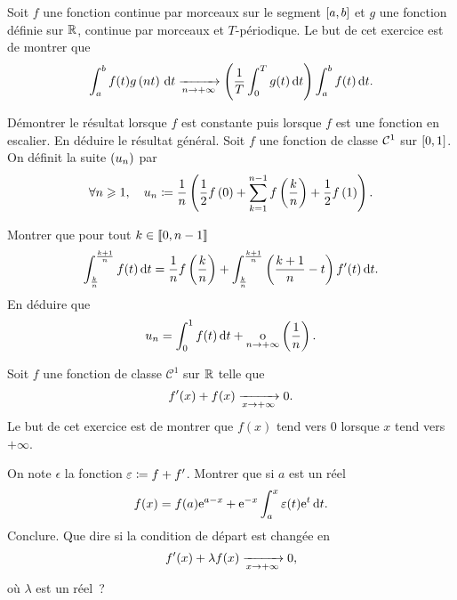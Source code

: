 \documentclass{magnolia}
\begin{document}
Soit $f$ une fonction continue par morceaux sur le segment $\left[a,b\right]$
et $g$ une fonction définie sur $\mathbb{R}$, continue par morceaux et $T$-périodique.
Le but de cet exercice est de montrer que
\[\int_{a}^{b} f(t)g\left(nt\right)\,\text{d}t \xrightarrow[n\rightarrow +\infty]{}
  \left(\frac{1}{T} \int_{0}^{T} g(t)\,\text{d}t\right) \int_{a}^{b} f(t)\,\text{d}t.\]
\begin{questions}
\question Démontrer le résultat lorsque $f$ est constante puis lorsque $f$
  est une fonction en escalier.
\question En déduire le résultat général.
\question Soit $f$ une fonction de classe $\mathcal{C}^{1}$ sur
  $\left[0,1\right]$. On définit la suite $\left(u_n\right)$ par
  \[\forall n\geqslant 1 ,\quad u_n\coloneqq \frac{1}{n}
    \left(\frac{1}{2}f\left(0\right)+\sum_{k=1}^{n-1} f\left(\frac{k}{n}\right)+\frac{1}{2}f\left(1\right)\right).\]
  \begin{questions}
  \question Montrer que pour tout $k\in\left\llbracket 0,n-1\right\rrbracket$
    \[\int_{\frac{k}{n}}^{\frac{k+1}{n}} f(t)\,\text{d}t=\frac{1}{n}f\left(\frac{k}{n}\right)
      +\int_{\frac{k}{n}}^{\frac{k+1}{n}} \left(\frac{k+1}{n}-t\right)f'(t)\,\text{d}t.\]
  \question En déduire que
    \[u_n=\int_{0}^{1} f(t)\,\text{d}t+\underset{n \rightarrow +\infty}{\text{o}}\left(\frac{1}{n}\right).\] 
  \end{questions}
\end{questions}

Soit $f$ une fonction de classe $\mathcal{C}^1$ sur $\mathbb{R}$ telle que
$$f'(x)+f(x) \xrightarrow[x\rightarrow +\infty]{} 0.$$
Le but de cet exercice est de montrer que $f(x)$ tend vers $0$ lorsque $x$
tend vers $+\infty$.
\begin{questions}
\question On note $\epsilon$ la fonction $\varepsilon\coloneqq f+f'$. Montrer que si $a$
  est un réel
  \[f(x)=f(a){\rm e}^{a-x}+{\rm e}^{-x}\int_{a}^{x} \varepsilon(t){\rm e}^t\,\text{d}t.\]
\question Conclure.
\question Que dire si la condition de départ est changée en
  \[f'(x)+\lambda f(x) \xrightarrow[x\rightarrow +\infty]{} 0,\]
  où $\lambda$ est un réel~?
\end{questions}
\end{document}
